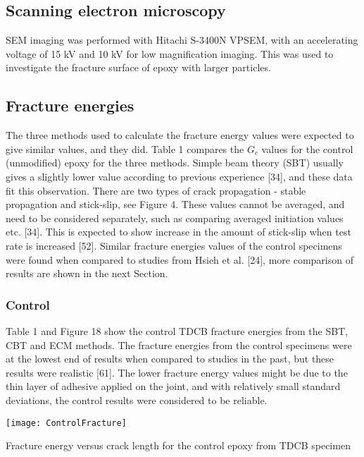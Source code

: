 \documentclass[numbers=noendperiod,chapterprefix=on]{icldt} %
\begin{document}
\subsection{Scanning electron microscopy}
SEM imaging was performed with Hitachi S-3400N VPSEM, with an accelerating voltage of 15 kV and 10 kV for low magnification imaging. This was used to investigate the fracture surface of epoxy with larger particles. 

\subsection{Fracture energies}
The three methods used to calculate the fracture energy values were expected to give similar values, and they did. Table 1 compares the $G_c$ values for the control (unmodified) epoxy for the three methods. Simple beam theory (SBT) usually gives a slightly lower value according to previous experience [34], and these data fit this observation. 
There are two types of crack propagation - stable propagation and stick-slip, see Figure 4. These values cannot be averaged, and need to be considered separately, such as comparing averaged initiation values etc. [34]. This is expected to show increase in the amount of stick-slip when test rate is increased [52]. 
Similar fracture energies values of the control specimens were found when compared to studies from Hsieh et al. [24], more comparison of results are shown in the next Section. 

\subsubsection{Control}
Table 1 and Figure 18 show the control TDCB fracture energies from the SBT, CBT and ECM methods. The fracture energies from the control specimens were at the lowest end of results when compared to studies in the past, but these results were realistic [61]. The lower fracture energy values might be due to the thin layer of adhesive applied on the joint, and with relatively small standard deviations, the control results were considered to be reliable.

\begin{table}[!htpb]
\centering
\texttt{[image: ControlFracture]}
\caption{Fracture energy versus crack length for the control epoxy from TDCB specimen} %
\end{table}
\end{document}
